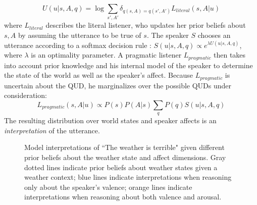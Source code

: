 \documentclass[10pt,letterpaper]{article}
\begin{document}
%
\begin{equation}
U(u | s, A, q) = \log \sum_{s', A'} \delta_{q(s, A)=q(s', A')} L_{literal}(s, A |u)
\end{equation}
where $L_{literal}$ describes the literal listener, who updates her prior beliefs about $s, A$ by assuming the utterance to be true of $s$. 
The speaker $S$ chooses an utterance according to a softmax decision rule \cite{sutton1998reinforcement}:
$S(u | s, A, q) \propto e^{\lambda U(u | s, A, q)}$,
where $\lambda$ is an optimality parameter.
%
A pragmatic listener $L_{pragmatic}$ then takes into account prior knowledge and his internal model of the speaker to determine the state of the world as well as the speaker's affect. Because $L_{pragmatic}$ is uncertain about the QUD, he marginalizes over the possible QUDs under consideration:
$$
L_{pragmatic}(s, A | u) \propto P(s) P(A | s) \sum_{q}{P (q) S (u|s, A, q)}
$$
%
The resulting distribution over world states and speaker affects is an \emph{interpretation} of the utterance. 

\begin{figure}
\caption{Model interpretations of ``The weather is terrible" given different prior beliefs about the weather state and affect dimensions. Gray dotted lines indicate prior beliefs about weather states given a weather context; blue lines indicate interpretations when reasoning only about the speaker's valence; orange lines indicate interpretations when reasoning about both valence and arousal.}
\label{sim12}
\end{figure}
\end{document}
